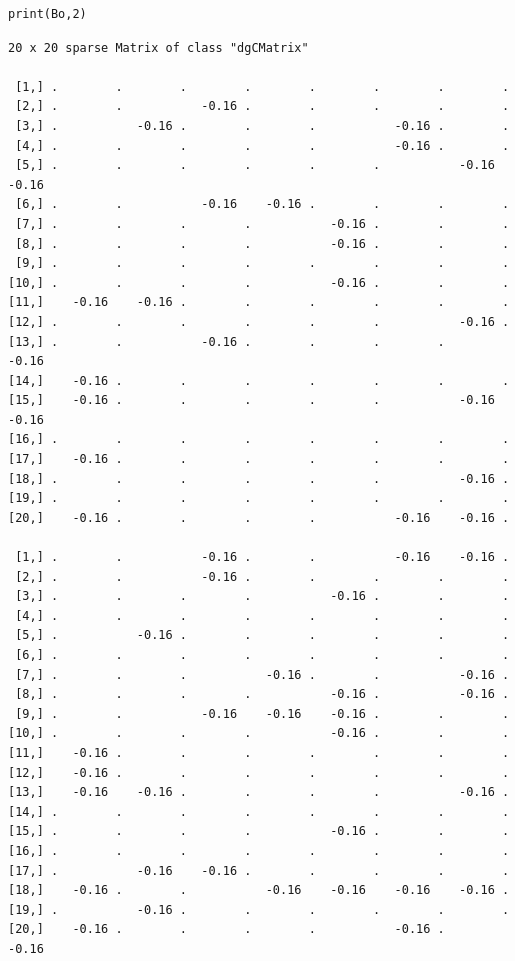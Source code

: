 \documentclass[11pt]{article}
\begin{document}
\begin{enumerate}
\lstset{language=r,label= ,caption= ,captionpos=b,numbers=none}
\begin{lstlisting}
print(Bo,2)
\end{lstlisting}

\begin{verbatim}
20 x 20 sparse Matrix of class "dgCMatrix"

 [1,] .        .        .        .        .        .        .        .
 [2,] .        .           -0.16 .        .        .        .        .
 [3,] .           -0.16 .        .        .           -0.16 .        .
 [4,] .        .        .        .        .           -0.16 .        .
 [5,] .        .        .        .        .        .           -0.16    -0.16
 [6,] .        .           -0.16    -0.16 .        .        .        .
 [7,] .        .        .        .           -0.16 .        .        .
 [8,] .        .        .        .           -0.16 .        .        .
 [9,] .        .        .        .        .        .        .        .
[10,] .        .        .        .           -0.16 .        .        .
[11,]    -0.16    -0.16 .        .        .        .        .        .
[12,] .        .        .        .        .        .           -0.16 .
[13,] .        .           -0.16 .        .        .        .           -0.16
[14,]    -0.16 .        .        .        .        .        .        .
[15,]    -0.16 .        .        .        .        .           -0.16    -0.16
[16,] .        .        .        .        .        .        .        .
[17,]    -0.16 .        .        .        .        .        .        .
[18,] .        .        .        .        .        .           -0.16 .
[19,] .        .        .        .        .        .        .        .
[20,]    -0.16 .        .        .        .           -0.16    -0.16 .

 [1,] .        .           -0.16 .        .           -0.16    -0.16 .
 [2,] .        .           -0.16 .        .        .        .        .
 [3,] .        .        .        .           -0.16 .        .        .
 [4,] .        .        .        .        .        .        .        .
 [5,] .           -0.16 .        .        .        .        .        .
 [6,] .        .        .        .        .        .        .        .
 [7,] .        .        .           -0.16 .        .           -0.16 .
 [8,] .        .        .        .           -0.16 .           -0.16 .
 [9,] .        .           -0.16    -0.16    -0.16 .        .        .
[10,] .        .        .        .           -0.16 .        .        .
[11,]    -0.16 .        .        .        .        .        .        .
[12,]    -0.16 .        .        .        .        .        .        .
[13,]    -0.16    -0.16 .        .        .        .           -0.16 .
[14,] .        .        .        .        .        .        .        .
[15,] .        .        .        .           -0.16 .        .        .
[16,] .        .        .        .        .        .        .        .
[17,] .           -0.16    -0.16 .        .        .        .        .
[18,]    -0.16 .        .           -0.16    -0.16    -0.16    -0.16 .
[19,] .           -0.16 .        .        .        .        .        .
[20,]    -0.16 .        .        .        .           -0.16 .           -0.16


\end{verbatim}
\end{enumerate}
\end{document}
